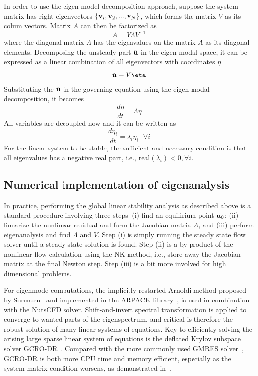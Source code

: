 \documentclass[journal,final]{new-aiaa}
\begin{document}
In order to use the eigen model decomposition approach, suppose
the system matrix has right eigenvectors $\{\mathbf{v}_i, \mathbf{v}_2, ..., \mathbf{v}_N\}$,
which forms the matrix $V$ as its colum vectors. Matrix $A$ can then
be factorized as 
\begin{equation*}
A=V\Lambda V^{-1}
\end{equation*}
where the diagonal matrix $\Lambda$ has the eigenvalues on the matrix $A$
as its diagonal elements.
Decomposing the unsteady part $\tilde {\mathbf{u}}$ in the eigen modal space,
it can be expressed as a linear combination of all eigenvectors with
coordinates $\eta$
\begin{equation*}
\tilde \uu = V {\mathbf \eta}
\end{equation*}
Substituting the $\tilde {\mathbf{u}}$ in the governing equation using the eigen modal
decomposition, it becomes
\begin{equation*}
\dfrac{d \eta}{dt}= \Lambda \eta
\end{equation*}
All variables are decoupled now and it
can be written as
\begin{equation*}
\dfrac{d \eta_i}{dt}= \lambda_i \eta_i  ~~~\forall i
\end{equation*}
For the linear system to be stable, the sufficient and necessary condition is
that all eigenvalues has a negative real part, i.e., real$(\lambda_i)<0, \forall i$.

\subsection{Numerical implementation of eigenanalysis}
In practice, performing the global linear stability analysis as described above
is a standard procedure involving three steps: (i) find an equilirium point $\mathbf{u}_0$; (ii) linearize the nonlinear residual and form
the Jacobian matrix $A$, and (iii) perform eigenanalysis and find $\Lambda$ and $V$. Step (i) is simply running the steady state flow solver until a steady state solution
is found. Step (ii) is a by-product of the nonlinear flow calculation using
the NK method, i.e., store away the Jacobian matrix at the final Newton step.
Step (iii) is a bit more involved for high dimensional problems.

For eigenmode computations, the implicitly restarted Arnoldi method proposed by Sorensen~\cite{sorensen1992implicit}
and implemented in the ARPACK library~\cite{lehoucq1998arpack}, is used
in combination with the NutsCFD solver.
Shift-and-invert spectral transformation is applied to converge to wanted parts
of the eigenspectrum, and critical is therefore the robust solution of many linear
systems of equations. 
Key to efficiently solving the arising large sparse linear system of equations
is the deflated Krylov subspace solver GCRO-DR~\cite{parks2006recycling}.
Compared with the more commonly used GMRES solver~\cite{saad1986gmres},
GCRO-DR is both more CPU time and memory efficient, especially as the system
matrix condition worsens, as demonstrated in~\cite{xu2016enabling,xu2017robust}.
\end{document}
